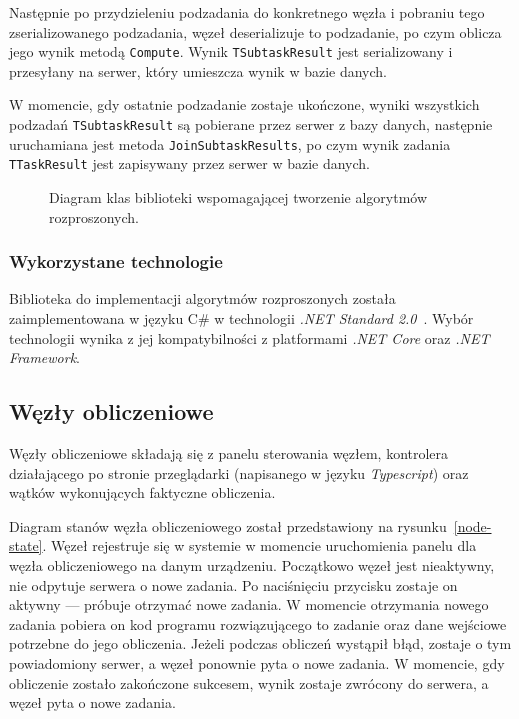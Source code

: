 \documentclass[a4paper,11pt,twoside]{report}
\theoremstyle{definition}
\begin{document}
Następnie po przydzieleniu podzadania do konkretnego węzła i pobraniu tego zserializowanego podzadania, węzeł deserializuje to podzadanie, po czym oblicza jego wynik metodą \texttt{Compute}. Wynik \texttt{TSubtaskResult} jest serializowany i przesyłany na serwer, który umieszcza wynik w bazie danych.

W momencie, gdy ostatnie podzadanie zostaje ukończone, wyniki wszystkich podzadań \texttt{TSubtaskResult} są pobierane przez serwer z bazy danych, następnie uruchamiana jest metoda \texttt{JoinSubtaskResults}, po czym wynik zadania \texttt{TTaskResult} jest zapisywany przez serwer w bazie danych.

\begin{figure} 
    \caption{Diagram klas biblioteki wspomagającej tworzenie algorytmów rozproszonych.}
    \label{library-class}
\end{figure}

\subsubsection{Wykorzystane technologie}
Biblioteka do implementacji algorytmów rozproszonych została zaimplementowana w języku C\# w technologii \textit{.NET Standard 2.0}~\cite{dotnet-standard}. Wybór technologii wynika z jej kompatybilności z platformami \textit{.NET Core} oraz \textit{.NET Framework}.

\subsection{Węzły obliczeniowe}

Węzły obliczeniowe składają się z panelu sterowania węzłem, kontrolera działającego po stronie przeglądarki (napisanego w języku \textit{Typescript}) oraz wątków wykonujących faktyczne obliczenia.

Diagram stanów węzła obliczeniowego został przedstawiony na rysunku~\ref{node-state}. Węzeł rejestruje się w systemie w momencie uruchomienia panelu dla węzła obliczeniowego na danym urządzeniu.
Początkowo węzeł jest nieaktywny, nie odpytuje serwera o nowe zadania.
Po naciśnięciu przycisku zostaje on aktywny --- próbuje otrzymać nowe zadania.
W momencie otrzymania nowego zadania pobiera on kod programu rozwiązującego to zadanie oraz dane wejściowe potrzebne do jego obliczenia. Jeżeli podczas obliczeń wystąpił błąd, zostaje o tym powiadomiony serwer, a węzeł ponownie pyta o nowe zadania.
W momencie, gdy obliczenie zostało zakończone sukcesem, wynik zostaje zwrócony do serwera, a węzeł pyta o nowe zadania.
\end{document}
